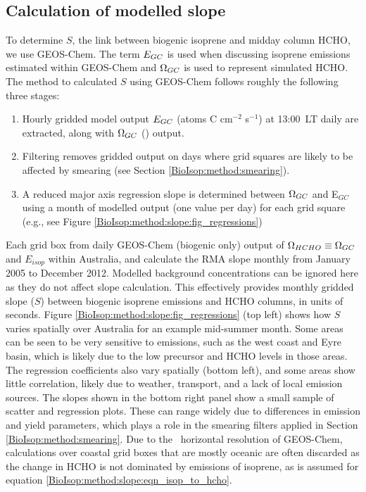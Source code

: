   \subsection{Calculation of modelled slope}
    \label{BioIsop:method:slope_calc}
    
    To determine $S$, the link between biogenic isoprene and midday column HCHO, we use GEOS-Chem.
    The term $E_{GC}$ is used when discussing isoprene emissions estimated within GEOS-Chem and $\Omega_{GC}$ is used to represent simulated HCHO.
    The method to calculated $S$ using GEOS-Chem follows roughly the following three stages: 
    \begin{enumerate}
      \item 
      Hourly gridded model output $E_{GC}$ (atoms C cm$^{-2}$ s$^{-1}$) at 13:00~LT daily are extracted, along with $\Omega_{GC}$  (\moleccm) output.
      \item
      Filtering removes gridded output on days where grid squares are likely to be affected by smearing (see Section \ref{BioIsop:method:smearing}).
      \item 
      A reduced major axis regression slope is determined between $\Omega_{GC}$ and E$_{GC}$ using a month of modelled output (one value per day) for each grid square (e.g., see Figure \ref{BioIsop:method:slope:fig_regressions})
    \end{enumerate}
    
    Each \lowhr grid box from daily GEOS-Chem (biogenic only) output of $\Omega_{HCHO} \equiv \Omega_{GC}$ and $E_{isop}$ within Australia, and calculate the RMA slope monthly from January 2005 to December 2012.
    Modelled background concentrations can be ignored here as they do not affect slope calculation.
    This effectively provides monthly gridded slope ($S$) between biogenic isoprene emissions and HCHO columns, in units of seconds.
    Figure \ref{BioIsop:method:slope:fig_regressions} (top left) shows how $S$ varies spatially over Australia for an example mid-summer month.
    Some areas can be seen to be very sensitive to emissions, such as the west coast and Eyre basin, which is likely due to the low precursor and HCHO levels in those areas.
    The regression coefficients also vary spatially (bottom left), and some areas show little correlation, likely due to weather, transport, and a lack of local emission sources.
    The slopes shown in the bottom right panel show a small sample of scatter and regression plots. 
    These can range widely due to differences in emission and yield parameters, which plays a role in the smearing filters applied in Section \ref{BioIsop:method:smearing}.
    Due to the \lowhr ~horizontal resolution of GEOS-Chem, calculations over coastal grid boxes that are mostly oceanic are often discarded as the change in HCHO is not dominated by emissions of isoprene, as is assumed for equation \ref{BioIsop:method:slope:eqn_isop_to_hcho}.
    
